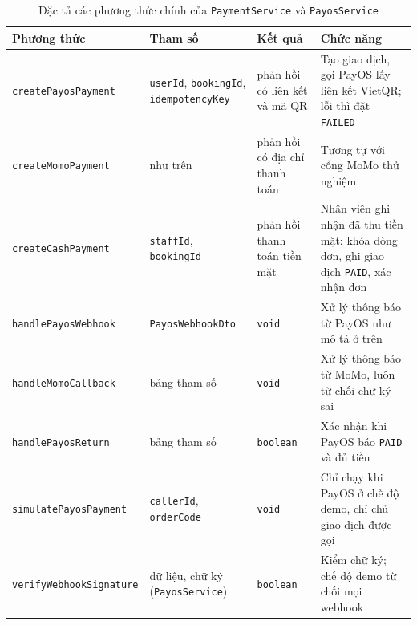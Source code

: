 \begin{table}[H]
\centering
\caption{Đặc tả các phương thức chính của \texttt{PaymentService} và \texttt{PayosService}}
\label{tab:ht_spec_payment}
\small
\renewcommand{\arraystretch}{1.25}
\begin{tabular}{|p{3.7cm}|p{3.3cm}|p{2.2cm}|p{4.6cm}|}
\hline
\textbf{Phương thức} & \textbf{Tham số} & \textbf{Kết quả} & \textbf{Chức năng} \\
\hline
\texttt{createPayosPayment} & \texttt{userId}, \texttt{bookingId}, \texttt{idempotencyKey} & phản hồi có liên kết và mã QR & Tạo giao dịch, gọi PayOS lấy liên kết VietQR; lỗi thì đặt \texttt{FAILED} \\
\hline
\texttt{createMomoPayment} & như trên & phản hồi có địa chỉ thanh toán & Tương tự với cổng MoMo thử nghiệm \\
\hline
\texttt{createCashPayment} & \texttt{staffId}, \texttt{bookingId} & phản hồi thanh toán tiền mặt & Nhân viên ghi nhận đã thu tiền mặt: khóa dòng đơn, ghi giao dịch \texttt{PAID}, xác nhận đơn \\
\hline
\texttt{handlePayosWebhook} & \texttt{PayosWebhookDto} & \texttt{void} & Xử lý thông báo từ PayOS như mô tả ở trên \\
\hline
\texttt{handleMomoCallback} & bảng tham số & \texttt{void} & Xử lý thông báo từ MoMo, luôn từ chối chữ ký sai \\
\hline
\texttt{handlePayosReturn} & bảng tham số & \texttt{boolean} & Xác nhận khi PayOS báo \texttt{PAID} và đủ tiền \\
\hline
\texttt{simulatePayosPayment} & \texttt{callerId}, \texttt{orderCode} & \texttt{void} & Chỉ chạy khi PayOS ở chế độ demo, chỉ chủ giao dịch được gọi \\
\hline
\texttt{verifyWebhookSignature} & dữ liệu, chữ ký (\texttt{PayosService}) & \texttt{boolean} & Kiểm chữ ký; chế độ demo từ chối mọi webhook \\
\hline
\end{tabular}
\end{table}


